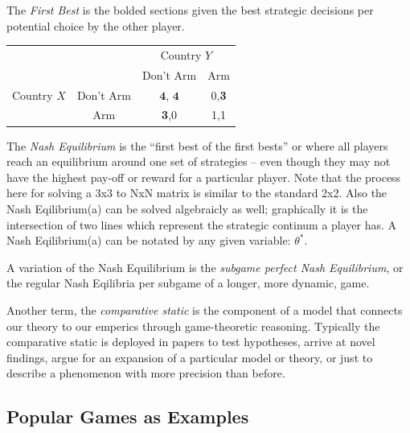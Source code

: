 \documentclass[12pt]{article}\usepackage[]{graphicx}\usepackage[]{color}
\begin{document}
\begin{flushleft}
The \textit{First Best} is the bolded sections given the best strategic decisions per potential choice by the other player.


  \begin{table}[h!] %
  \centering        %
    \setlength{\extrarowheight}{2pt}
    \begin{tabular}{cc|c|c|}
      & \multicolumn{1}{c}{} & \multicolumn{2}{c}{Country $Y$}\\
      & \multicolumn{1}{c}{} & \multicolumn{1}{c}{Don't Arm}  & \multicolumn{1}{c}{Arm} \\\cline{3-4}
      {Country $X$}  & Don't Arm & $\textbf{4, 4} $ & 0,\textbf{3} \\\cline{3-4}
      & Arm & \textbf{3},0 & 1,1 \\\cline{3-4}
    \end{tabular}
  \end{table}

The \textit{Nash Equilibrium} is the ``first best of the first bests'' or where all players reach an equilibrium around one set of strategies -- even though they may not have the highest pay-off or reward for a particular player. Note that the process here for solving a 3x3 to NxN matrix is similar to the standard 2x2. Also the Nash Eqilibrium(a) can be solved algebraicly as well; graphically it is the intersection of two lines which represent the strategic continum a player has. A Nash Eqilibrium(a) can be notated by any given variable: $\theta^*$.

A variation of the Nash Equilibrium is the \textit{subgame perfect Nash Equilibrium}, or the regular Nash Eqilibria per subgame of a longer, more dynamic, game.

Another term, the \textit{comparative static} is the component of a model that connects our theory to our emperics through game-theoretic reasoning. Typically the comparative static is deployed in papers to test hypotheses, arrive at novel findings, argue for an expansion of a particular model or theory, or just to describe a phenomenon with more precision than before.


\subsection{Popular Games as Examples}







\end{flushleft}
\end{document}
